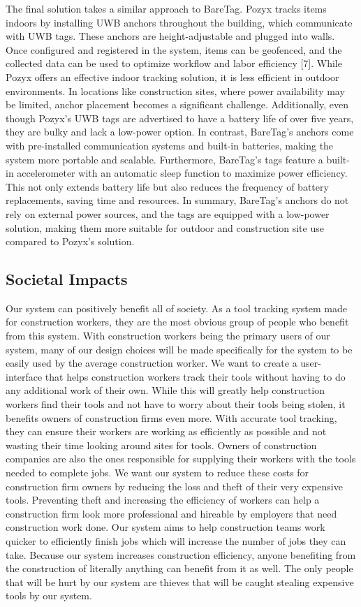 \documentclass[conference]{IEEEtran}
\begin{document}
The final solution takes a similar approach to BareTag. Pozyx tracks 
items indoors by installing UWB anchors throughout the building, which 
communicate with UWB tags. These anchors are height-adjustable and 
plugged into walls. Once configured and registered in the system, 
items can be geofenced, and the collected data can be used to optimize 
workflow and labor efficiency [7]. While Pozyx offers an effective 
indoor tracking solution, it is less efficient in outdoor environments. 
In locations like construction sites, where power availability may be 
limited, anchor placement becomes a significant challenge. Additionally, 
even though Pozyx’s UWB tags are advertised to have a battery life of over 
five years, they are bulky and lack a low-power option. In contrast, 
BareTag’s anchors come with pre-installed communication systems and 
built-in batteries, making the system more portable and scalable. 
Furthermore, BareTag’s tags feature a built-in accelerometer with an 
automatic sleep function to maximize power efficiency. This not only 
extends battery life but also reduces the frequency of battery 
replacements, saving time and resources. In summary, BareTag's anchors 
do not rely on external power sources, and the tags are equipped with a 
low-power solution, making them more suitable for outdoor and construction 
site use compared to Pozyx’s solution.

\subsection{Societal Impacts}

Our system can positively benefit all of society. As a tool tracking 
system made for construction workers, they are the most obvious group 
of people who benefit from this system. With construction workers being 
the primary users of our system, many of our design choices will be made 
specifically for the system to be easily used by the average construction 
worker. We want to create a user-interface that helps construction workers 
track their tools without having to do any additional work of their own. 
While this will greatly help construction workers find their tools and 
not have to worry about their tools being stolen, it benefits owners of 
construction firms even more. With accurate tool tracking, they can 
ensure their workers are working as efficiently as possible and not 
wasting their time looking around sites for tools. Owners of construction 
companies are also the ones responsible for supplying their workers with 
the tools needed to complete jobs. We want our system to reduce these 
costs for construction firm owners by reducing the loss and theft of 
their very expensive tools. Preventing theft and increasing the 
efficiency of workers can help a construction firm look more professional 
and hireable by employers that need construction work done. Our system 
aims to help construction teams work quicker to efficiently finish jobs 
which will increase the number of jobs they can take. Because our system 
increases construction efficiency, anyone benefiting from the construction 
of literally anything can benefit from it as well. The only people that 
will be hurt by our system are thieves that will be caught stealing 
expensive tools by our system.
\end{document}
